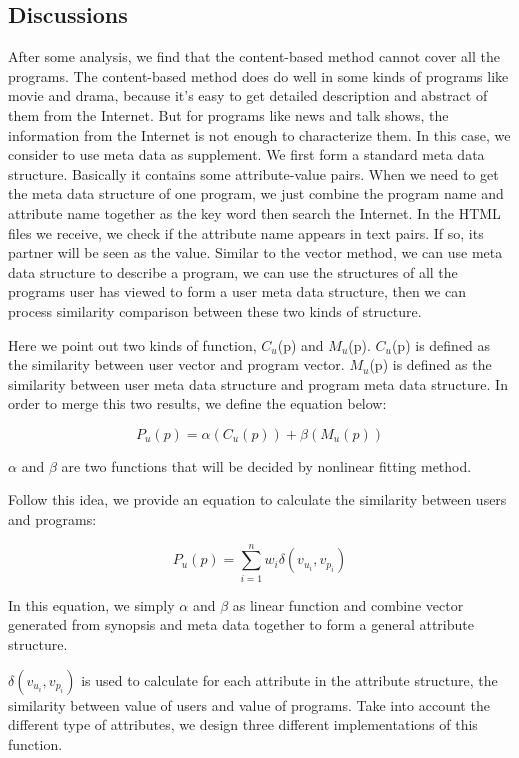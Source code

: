 \subsection{Discussions}
After some analysis, we find that the content-based method cannot cover
all the programs. The content-based method does do well in some kinds
of programs like movie and drama, because it's easy to get detailed
description and abstract of them from the Internet.
But for programs like news and talk shows, the information from the
Internet is not enough to characterize them. In
this case, we consider to use meta data as supplement. We first form a standard meta data
structure. Basically it contains some attribute-value pairs. When we need to get the meta data
structure of one program, we just combine the program name and attribute name together as the
key word then search the Internet. In the HTML files we receive, we check if the attribute
name appears in text pairs. If so, its partner will be seen as the value. Similar to the vector
method, we can use meta data structure to describe a program, we can use the structures of all
the programs user has viewed to form a user meta data structure, then we can process similarity
comparison between these two kinds of structure.

Here we point out two kinds of function, $C_u$(p) and $M_u$(p). $C_u$(p) is defined as the
similarity between user vector and program vector. $M_u$(p) is defined as the similarity
between user meta data structure and program meta data structure. In order to merge this
two results, we define the equation below:

\[P_u(p) = \alpha(C_u(p))+\beta(M_u(p))\]

$\alpha$ and $\beta$ are two functions that will be decided by nonlinear fitting method.

Follow this idea, we provide an equation to calculate the similarity between users and programs:

\[P_u(p) = \sum_{i=1}^nw_i\delta(v_{u_i},v_{p_i})\]

In this equation, we simply $\alpha$ and $\beta$ as linear function and combine vector generated
from synopsis and meta data together to form a general attribute structure.

$\delta(v_{u_i},v_{p_i})$ is used to calculate for each attribute in the attribute structure,
the similarity between value of users and value of programs. Take into account the different
type of attributes, we design three different implementations of this function.

